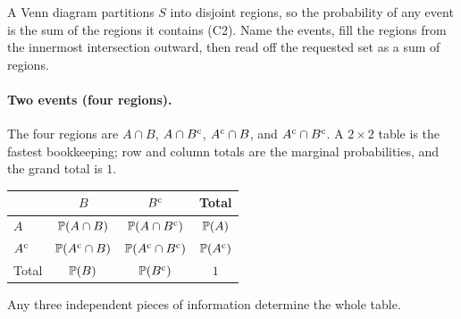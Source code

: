 A Venn diagram partitions $S$ into disjoint regions, so the probability of any
event is the sum of the regions it contains (C2). Name the events, fill the regions
from the innermost intersection outward, then read off the requested set as a sum
of regions.

\paragraph{Two events (four regions).}
The four regions are $A\cap B$, $A \cap B^{\mathrm{c}}$, $A^{\mathrm{c}} \cap B$, and
$A^{\mathrm{c}} \cap B^{\mathrm{c}}$. A $2\times 2$ table is the fastest bookkeeping; row and column
totals are the marginal probabilities, and the grand total is $1$.
\begin{center}
\begin{tabular}{@{}lccc@{}}
\toprule
 & $B$ & $B^{\mathrm{c}}$ & Total \\
\midrule
$A$      & $\mathbb{P}(A \cap B)$        & $\mathbb{P}(A \cap B^{\mathrm{c}})$        & $\mathbb{P}(A)$ \\
$A^{\mathrm{c}}$ & $\mathbb{P}(A^{\mathrm{c}} \cap B)$   & $\mathbb{P}(A^{\mathrm{c}} \cap B^{\mathrm{c}})$   & $\mathbb{P}(A^{\mathrm{c}})$ \\
\midrule
Total    & $\mathbb{P}(B)$               & $\mathbb{P}(B^{\mathrm{c}})$               & $1$ \\
\bottomrule
\end{tabular}
\end{center}
Any three independent pieces of information determine the whole table.


